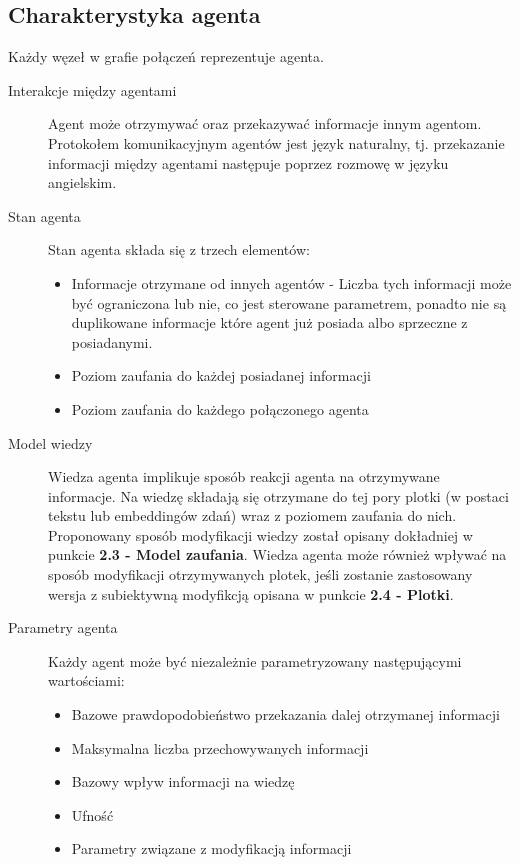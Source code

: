 \documentclass{article}
\begin{document}
	\subsection{Charakterystyka agenta}
	Każdy węzeł w grafie połączeń reprezentuje agenta.
	\begin{description}
		\item[Interakcje między agentami]
		Agent może otrzymywać oraz przekazywać informacje innym agentom.
		Protokołem komunikacyjnym agentów jest język naturalny, tj.
		przekazanie informacji między agentami następuje poprzez rozmowę
w języku angielskim.
		\item[Stan agenta]
		Stan agenta składa się z trzech elementów:
		\begin{itemize}
			\item {Informacje otrzymane od innych agentów - 
			Liczba tych informacji może być ograniczona lub nie, co jest sterowane parametrem,
			ponadto nie są duplikowane informacje które agent już posiada albo sprzeczne z posiadanymi.}
			\item {Poziom zaufania do każdej posiadanej informacji}
			\item {Poziom zaufania do każdego połączonego agenta}
		\end{itemize}	
		\item[Model wiedzy]
		Wiedza agenta implikuje sposób reakcji agenta na otrzymywane informacje. Na wiedzę składają się otrzymane do tej pory plotki (w postaci tekstu lub embeddingów zdań) wraz z poziomem zaufania do nich. Proponowany sposób modyfikacji wiedzy został opisany dokładniej w punkcie \textbf{2.3 - Model zaufania}. Wiedza agenta może również wpływać na sposób modyfikacji otrzymywanych plotek, jeśli zostanie zastosowany wersja z subiektywną modyfikcją opisana w punkcie \textbf{2.4 - Plotki}.
		\item[Parametry agenta] Każdy agent może być niezależnie parametryzowany następującymi wartościami:
		\begin{itemize}
			\item{Bazowe prawdopodobieństwo przekazania dalej otrzymanej informacji}
			\item{Maksymalna liczba przechowywanych informacji}
			\item{Bazowy wpływ informacji na wiedzę}
			\item{Ufność}
			\item{Parametry związane z modyfikacją informacji}
		\end{itemize}
	\end{description}
\end{document}

